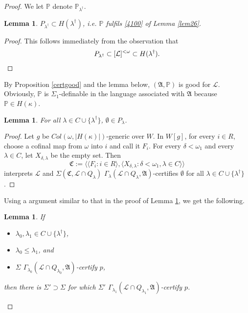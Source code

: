 \documentclass[12pt, twoside]{memoir}
\numberwithin{equation}{section}
\newtheorem{lem}[thm]{Lemma}
\theoremstyle{definition}
\theoremstyle{remark}
\theoremstyle{definition}
\theoremstyle{definition}
\theoremstyle{definition}
\theoremstyle{remark}
\begin{document}
\begin{proof}
We let $\mathbb{P}$ denote $\mathbb{P}_{\lambda^{\dagger}}$. 

\begin{lem}\label{size}
$P_{\lambda^{\dagger}} \subset H(\lambda^{\dagger})$, i.e. $\mathbb{P}$ fulfils \ref{4100} of Lemma \ref{lem26}.
\end{lem}

\begin{proof}
This follows immediately from the observation that
\begin{equation*}
    P_{\lambda^{\dagger}} \subset [\mathcal{L}]^{<\omega} \subset H(\lambda^{\dagger}) \text{.} \qedhere
\end{equation*}
\end{proof}

By Proposition \ref{certgood} and the lemma below, $(\mathfrak{A}, \mathbb{P})$ is good for $\mathcal{L}$. Obviously, $\mathbb{P}$ is $\Sigma_1$-definable in the language associated with $\mathfrak{A}$ because $\mathbb{P} \in H(\kappa)$.

\begin{lem}\label{nonemp}
For all $\lambda \in C \cup \{\lambda^{\dagger}\}$, $\emptyset \in P_{\lambda}$.
\end{lem}

\begin{proof}
Let $g$ be $Col(\omega, |H(\kappa)|)$-generic over $W$. In $W[g]$, for every $i \in R$, choose a cofinal map from $\omega$ into $i$ and call it $F_i$. For every $\delta < \omega_1$ and every $\lambda \in C$, let $X_{\delta, \lambda}$ be the empty set. Then $$\mathfrak{C} := \langle \langle F_i : i \in R \rangle, \langle X_{\delta, \lambda} : \delta < \omega_1, \lambda \in C \rangle \rangle$$ interprets $\mathcal{L}$ and $\Sigma(\mathfrak{C}, \mathcal{L} \cap Q_{\lambda})$ $\Gamma_{\lambda} (\mathcal{L} \cap Q_{\lambda}, \mathfrak{A})$-certifies $\emptyset$ for all $\lambda \in C \cup \{\lambda^{\dagger}\}$.  
\end{proof}

Using a argument similar to that in the proof of Lemma \ref{nonemp}, we get the following.

\begin{lem}\label{extcert}
If 
\begin{itemize}
    \item $\lambda_0, \lambda_1 \in C \cup \{\lambda^{\dagger}\}$, 
    \item $\lambda_0 \leq \lambda_1$, and 
    \item $\Sigma$ $\Gamma_{\lambda_0} (\mathcal{L} \cap Q_{\lambda_0}, \mathfrak{A})$-certify $p$, 
\end{itemize}
then there is $\Sigma' \supset \Sigma$ for which $\Sigma'$ $\Gamma_{\lambda_1} (\mathcal{L} \cap Q_{\lambda_1}, \mathfrak{A})$-certify $p$.
\end{lem}


\end{proof}
\end{document}
